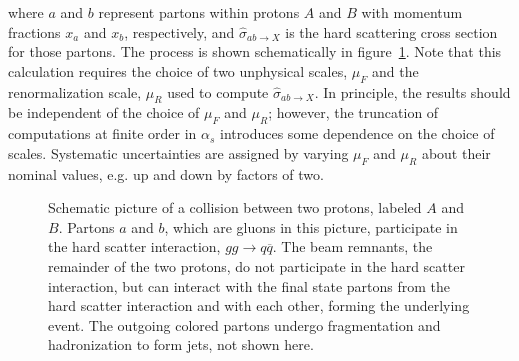 where $a$ and $b$ represent partons within protons $A$ and $B$ with momentum fractions $x_a$ and $x_b$, respectively, and $\hat{\sigma}_{ab\rightarrow X}$ is the hard scattering cross section for those partons. The process is shown schematically in figure~\ref{fig:pp-collision}. Note that this calculation requires the choice of two unphysical scales, $\mu_F$ and the renormalization scale, $\mu_R$ used to compute $\hat{\sigma}_{ab\rightarrow X}$. In principle, the results should be independent of the choice of $\mu_F$ and $\mu_R$; however, the truncation of computations at finite order in $\alpha_s$ introduces some dependence on the choice of scales. Systematic uncertainties are assigned by varying $\mu_F$ and $\mu_R$ about their nominal values, e.g. up and down by factors of two. 

\begin{figure}[htbp]
	\centering
	\caption{Schematic picture of a collision between two protons, labeled $A$ and $B$. Partons $a$ and $b$, which are gluons in this picture, participate in the hard scatter interaction, $gg\rightarrow q\overline{q}$. The beam remnants, the remainder of the two protons, do not participate in the hard scatter interaction, but can interact with the final state partons from the hard scatter interaction and with each other, forming the underlying event. The outgoing colored partons undergo fragmentation and hadronization to form jets, not shown here. }
	\label{fig:pp-collision}
\end{figure}


